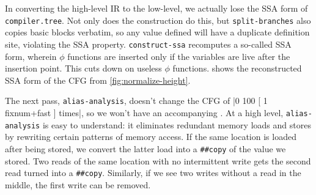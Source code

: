 
In converting the high-level \gls{IR} to the low-level, we actually lose the
\gls{SSA} form of \Verb|compiler.tree|.  Not only does the construction do
this, but \Verb|split-branches| also copies basic blocks verbatim, so any
value defined will have a duplicate definition site, violating the \gls{SSA}
property.  \Verb|construct-ssa| recomputes a so-called 
\gls{SSA} form, wherein $\phi$ functions are inserted only if the variables are
live after the insertion point.  This cuts down on useless $\phi$ 
%
functions.
%
 shows the reconstructed \gls{SSA} form of the
\gls{CFG} from \vref{fig:normalize-height}.

The next pass, \Verb|alias-analysis|, doesn't change the \gls{CFG} of
%
\factor|0 100 [ 1 fixnum+fast ] times|,
%
so we won't have an accompanying .  At a high
level, \Verb|alias-analysis| is easy to understand: it eliminates redundant
memory loads and stores by rewriting certain patterns of memory access.  If the
same location is loaded after being stored, we convert the latter load into a
\Verb|##copy| of the value we stored.  Two reads of the same location with no
intermittent write gets the second read turned into a \Verb|##copy|.
Similarly, if we see two writes without a read in the middle, the first write
can be removed.


